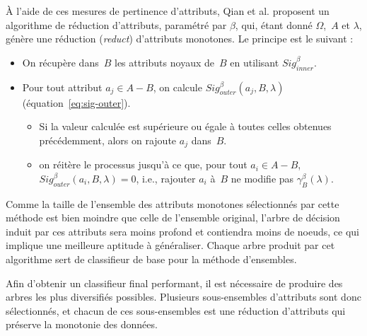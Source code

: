 \documentclass[a4paper]{article}
\renewcommand{\eqref}[1]{équation~\ref{#1}}
\begin{document}
À l'aide de ces mesures de pertinence d'attributs, Qian et al.
\cite{qian-fusing} proposent un algorithme de réduction d'attributs, paramétré
par $\beta$, qui, étant donné $\Omega$,~$A$ et $\lambda$, génère une réduction
(\emph{reduct}) d'attributs monotones. Le principe est le suivant :

\begin{itemize}
    \item On récupère dans~$B$ les attributs noyaux de~$B$ en utilisant
        $Sig^{\beta}_{inner}$.
    \item Pour tout attribut $a_j \in A-B$, on calcule $Sig^{\beta}_{outer}(a_j,
        B, \lambda)$ (\eqref{eq:sig-outer}). 
    \begin{itemize}
        \item Si la valeur calculée est supérieure ou égale à toutes celles obtenues
            précédemment, alors on rajoute $a_j$ dans~$B$.
        \item on réitère le processus jusqu'à ce que, pour tout $a_i \in A-B$,
            $Sig^{\beta}_{outer}(a_i, B, \lambda) = 0$, i.e., rajouter $a_i$
            à~$B$ ne modifie pas $\gamma^{\beta}_{B}(\lambda)$.
    \end{itemize}
\end{itemize}

\noindent Comme la taille de l'ensemble des attributs monotones sélectionnés par cette
méthode est bien moindre que celle de l'ensemble original, l'arbre de décision
induit par ces attributs sera moins profond et contiendra moins de noeuds, ce
qui implique une meilleure aptitude à généraliser. Chaque arbre produit par cet
algorithme sert de classifieur de base pour la méthode d'ensembles.

Afin d'obtenir un classifieur final performant, il est nécessaire de produire
des arbres les plus diversifiés possibles. Plusieurs sous-ensembles d'attributs
sont donc sélectionnés, et chacun de ces sous-ensembles est une réduction d'attributs
qui préserve la monotonie des données. 
\end{document}
